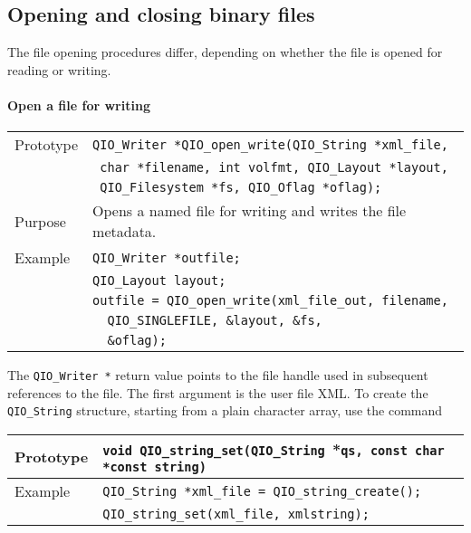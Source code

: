 \documentclass{article}
\newcommand{\QIOstring}{{\tt QIO\_String }}
\begin{document}
\subsection{Opening and closing binary files}

The file opening procedures differ, depending on whether the file is
opened for reading or writing.

\paragraph{Open a file for writing}

\begin{flushleft}
  \begin{tabular}{|l|l|}
  \hline
  Prototype      & \verb|QIO_Writer *QIO_open_write(|\QIOstring \verb|*xml_file,|\\
		 & \verb| char *filename, int volfmt, QIO_Layout *layout, | \\
                 & \verb| QIO_Filesystem *fs, QIO_Oflag *oflag);| \\
  Purpose        & Opens a named file for writing and writes the file metadata. \\
\hline
  Example  & \verb|QIO_Writer *outfile;| \\
           & \verb|QIO_Layout layout;| \\
           & \verb|outfile = QIO_open_write(xml_file_out, filename, |\\
	   & \verb|  QIO_SINGLEFILE, &layout, &fs, |\\
           & \verb|  &oflag); |\\
   \hline
 \end{tabular}
\end{flushleft}
%
The \verb|QIO_Writer *| return value points to the file handle used in
subsequent references to the file.  The first argument is the user
file XML.  To create the \verb|QIO_String| structure, starting from a
plain character array, use the command

\begin{flushleft}
  \begin{tabular}{|l|l|}
  \hline
  Prototype      & \verb|void QIO_string_set(|\QIOstring *\verb|qs, const char *const string)|\\
  \hline
   Example    & \QIOstring \verb|*xml_file = QIO_string_create();|\\
              & \verb|QIO_string_set(xml_file, xmlstring);|\\
   \hline
 \end{tabular}
\end{flushleft}
\end{document}
